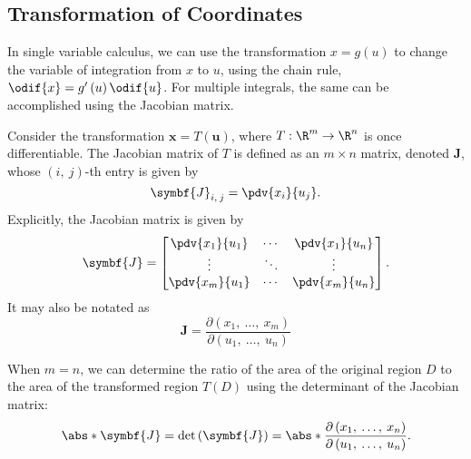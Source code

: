 \documentclass{article}
\begin{document}
\subsection{Transformation of Coordinates}
In single variable calculus, we can use the transformation \(x =
g\left( u \right)\) to change the variable of integration from \(x\) to
\(u\), using the chain rule, \(\odif{x} = g'\left( u \right)
\odif{u}\). For multiple integrals, the same can be accomplished using
the Jacobian matrix.
\begin{definition}
    Consider the transformation \(\symbf{x} = T\left( \symbf{u} \right)\),
    where \(T : \R^m \to \R^n\) is once differentiable. The Jacobian
    matrix of \(T\) is defined as an \(m \times n\) matrix, denoted
    \(\symbf{J}\), whose \(\left( i,\: j \right)\)-th entry is given by
    \begin{equation*}
        \symbf{J}_{i,\: j} = \pdv{x_i}{u_j}.
    \end{equation*}
    Explicitly, the Jacobian matrix is given by
    \begin{equation*}
        \symbf{J} =
        \displaystyle
        \begin{bmatrix}
            \displaystyle\pdv{x_1}{u_1} & \displaystyle\cdots & \displaystyle\pdv{x_1}{u_n} \\
            \displaystyle\vdots         & \displaystyle\ddots & \displaystyle\vdots         \\
            \displaystyle\pdv{x_m}{u_1} & \displaystyle\cdots & \displaystyle\pdv{x_m}{u_n} \\
        \end{bmatrix}
        .
    \end{equation*}
    It may also be notated as
    \begin{equation*}
        \symbf{J} = \frac{\partial\left( x_1,\: \ldots,\: x_m \right)}{\partial\left( u_1,\: \ldots,\: u_n \right)}
    \end{equation*}
\end{definition}
\begin{definition}[Jacobian]
    When \(m = n\), we can determine the ratio of the area of the
    original region \(D\) to the area of the transformed region
    \(T\left( D \right)\) using the determinant of the Jacobian matrix:
    \begin{equation*}
        \abs*{\symbf{J}} = \det{\left( \symbf{J} \right)} = \abs*{\frac{\partial\left( x_1,\: \ldots,\: x_n \right)}{\partial\left( u_1,\: \ldots,\: u_n \right)}}.
    \end{equation*}
\end{definition}
\end{document}
